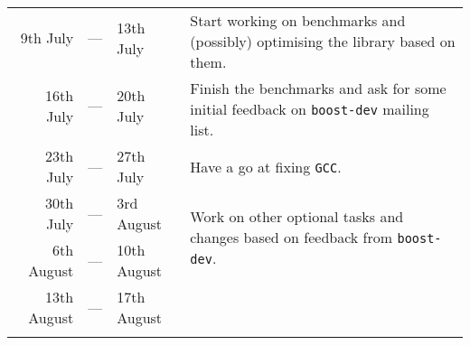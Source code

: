 \documentclass[a4paper,12pt]{article}
\begin{document}
\begin{center}
\begin{tabular}{|r c l|p{10cm}|}
        \noalign{\smallskip} \hline \noalign{\smallskip}
        9th  July   & --- & 13th July   & \multirow{2}{10cm}{%
            Start working on benchmarks and (possibly) optimising the library
            based on them.
        } \\
                    &     &             & \\
        \noalign{\smallskip} \hline \noalign{\smallskip}
        16th July   & --- & 20th July   & \multirow{2}{10cm}{%
            Finish the benchmarks and ask for some initial feedback on
            \texttt{boost-dev} mailing list.
        } \\
                    &     &             & \\
        \noalign{\smallskip} \hline \noalign{\smallskip}
        23th July   & --- & 27th July   & Have a go at fixing \texttt{GCC}. \\
        \noalign{\smallskip} \hline \noalign{\smallskip}
        30th July   & --- & 3rd  August & \multirow{2}{10cm}{%
            Work on other optional tasks and changes based on feedback from
            \texttt{boost-dev}.
        } \\
        6th  August & --- & 10th August & \\
        13th August & --- & 17th August & \\
        \noalign{\smallskip} \hline
    \end{tabular}
    \end{center}
\newpage

\end{document}
